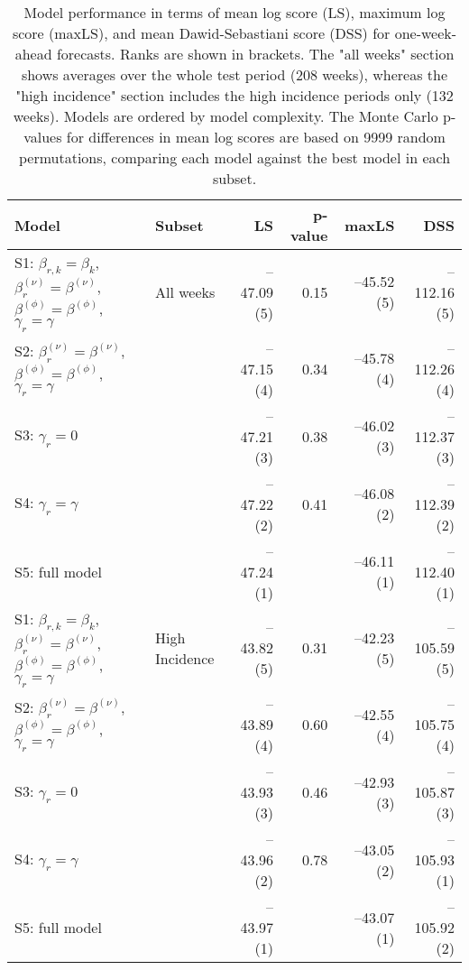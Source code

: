 \begin{table}[ht]
\centering
\begingroup\fontsize{9pt}{10pt}\selectfont
\begin{tabular}{ll|rrrr}
  \hline
Model & Subset & LS & p-value & maxLS & DSS \\ 
  \hline
S1: $\beta_{r,k} = \beta_{k}$, $\beta_{r}^{(\nu)} = \beta^{(\nu)}$, $\beta^{(\phi)} = \beta^{(\phi)}$, $\gamma_r = \gamma$ & All weeks & --47.09 (5) & 0.15 & --45.52 (5) & --112.16 (5) \\ 
  S2: $\beta_{r}^{(\nu)} = \beta^{(\nu)}$, $\beta^{(\phi)} = \beta^{(\phi)}$, $\gamma_r = \gamma$ &  & --47.15 (4) & 0.34 & --45.78 (4) & --112.26 (4) \\ 
  S3: $\gamma_r = 0$ &  & --47.21 (3) & 0.38 & --46.02 (3) & --112.37 (3) \\ 
  S4: $\gamma_r = \gamma$ &  & --47.22 (2) & 0.41 & --46.08 (2) & --112.39 (2) \\ 
  S5: full model &  & --47.24 (1) &  & --46.11 (1) & --112.40 (1) \\ 
   \hline
S1: $\beta_{r,k} = \beta_{k}$, $\beta_{r}^{(\nu)} = \beta^{(\nu)}$, $\beta^{(\phi)} = \beta^{(\phi)}$, $\gamma_r = \gamma$ & High Incidence & --43.82 (5) & 0.31 & --42.23 (5) & --105.59 (5) \\ 
  S2: $\beta_{r}^{(\nu)} = \beta^{(\nu)}$, $\beta^{(\phi)} = \beta^{(\phi)}$, $\gamma_r = \gamma$ &  & --43.89 (4) & 0.60 & --42.55 (4) & --105.75 (4) \\ 
  S3: $\gamma_r = 0$ &  & --43.93 (3) & 0.46 & --42.93 (3) & --105.87 (3) \\ 
  S4: $\gamma_r = \gamma$ &  & --43.96 (2) & 0.78 & --43.05 (2) & --105.93 (1) \\ 
  S5: full model &  & --43.97 (1) &  & --43.07 (1) & --105.92 (2) \\ 
   \hline
\end{tabular}
\endgroup
\caption{Model performance in terms of mean log score (LS),
             maximum log score (maxLS), and mean Dawid-Sebastiani score (DSS)
             for one-week-ahead forecasts.
             Ranks are shown in brackets.
             The "all weeks" section shows averages over the
             whole test period (208 weeks),
             whereas the "high incidence" section includes
             the high incidence periods only (132 weeks).
             Models are ordered by model complexity.
             The Monte Carlo p-values for differences in mean log scores
             are based on 9999 random permutations,
             comparing each model against the best model in each subset.} 
\label{tab:forecast}
\end{table}
